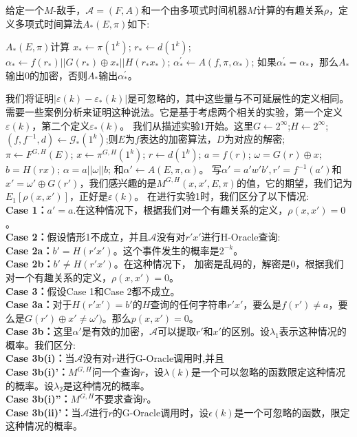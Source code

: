 \documentclass[]{article}
\begin{document}
    给定一个$M$-敌手，$ \mathcal{A}= (F, A)$和一个由多项式时间机器$M$计算的有趣关系$\rho$，定义多项式时间算法$A_*(E,\pi)$如下:
    \par
 
    \begin{flushleft}
    	\setlength{\leftskip}{3em}
    	$A_*(E,\pi)$计算
    	$x_*\leftarrow \pi(1^k)$;
    	$r_*\leftarrow d(1^k)$;
    	$\alpha_*\leftarrow f(r_*) || G(r_*)\oplus x_* || H(r_*x_*)$;
    	$\alpha_{*}^{'} \leftarrow A(f,\pi,\alpha_*)$;
    	如果$\alpha _{*}^{'}=\alpha _*$，那么$A_*$输出0的加密，否则$A_*$输出$\alpha_{*}^{'}$。
    \end{flushleft}    
    \par
    
    我们将证明$|\varepsilon(k)-\varepsilon_*(k)|$是可忽略的，其中这些量与不可延展性的定义相同。
    需要一些案例分析来证明这种说法。它是基于考虑两个相关的实验，第一个定义$\varepsilon(k)$，第二个定义$\varepsilon_*(k)$。
    我们从描述实验1开始。这里$G \leftarrow 2^\infty$;$H \leftarrow 2^\infty$;$(f,f^{-1},d)\leftarrow \mathcal{G}_*(1^k)$;则$E$为$f$表达的加密算法，$D$为对应的解密;
    $\pi \leftarrow F^{G,H}(E)$;
    $x\leftarrow \pi ^{G,H}(1^k)$;
    $r\leftarrow d(1^k)$;
    $a=f(r)$;
    $\omega=G(r)\oplus x$;
    $b=H(rx)$;
    $\alpha = a || \omega || b$;
    和$\alpha'\leftarrow A(E,\pi,\alpha)$。
    写$\alpha'=a'w'b',r'=f^{-1}(a')$和$x'=\omega'\oplus G(r')$，我们感兴趣的是$M^{G,H}(x,x',E,\pi)$的值，它的期望，我们记为$E_1[\rho(x,x')]$，正好是$\varepsilon(k)$。
    在进行实验1时，我们区分了以下情况:\\
    \textbf{Case 1：}$a'=a$.在这种情况下，根据我们对一个有趣关系的定义，$\rho(x,x') = 0$。
    \\
    \textbf{Case 2：}假设情形1不成立，并且$\mathcal{A}$没有对$r'x'$进行H-Oracle查询:
    \\
    \textbf{Case 2a：}$b'=H(r'x')$。这个事件发生的概率是$2^{-k}$。
    \\
    \textbf{Case 2b：}$b'\neq H(r'x')$。在这种情况下，
    加密是乱码的，解密是0，根据我们对一个有趣关系的定义，$\rho(x,x') = 0$。
    \\
    \textbf{Case 3：}假设Case 1和Case 2都不成立。
    \\
    \textbf{Case 3a：}对于$H(r'x') = b'$的$H$查询的任何字符串$r'x'$，要么是$f(r')\neq a$，要么是$G(r')\oplus x'\neq \omega')$。那么$p(x,x') = 0$。
    \\
    \textbf{Case 3b：}这里$\alpha'$是有效的加密，$\mathcal{A}$可以提取$r'$和$x'$的区别。设$\lambda_1$表示这种情况的概率。我们区分:
    \\
    \textbf{Case 3b(i)：}当$\mathcal{A}$没有对$r$进行G-Oracle调用时,并且
    \\
    \textbf{Case 3b(i)'：}$M^{G,H}$问一个查询$r$，设$\lambda(k)$是一个可以忽略的函数限定这种情况的概率。设$\lambda_2$是这种情况的概率。
    \\
    \textbf{Case 3b(i)''：}$M^{G,H}$不要求查询$r$。
    \\
    \textbf{Case 3b(ii)'：}当$\mathcal{A}$进行$r$的G-Oracle调用时，设$\epsilon(k)$是一个可忽略的函数，限定这种情况的概率。
    \par
    
\end{document}
